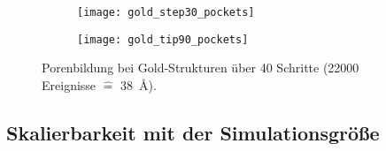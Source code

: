 \begin{figure}
  \captionsetup[subfigure]{singlelinecheck=false}
  \def\subfigwidth{0.49\textwidth}

  \begin{subfigure}[t]{\subfigwidth}
    \texttt{[image: gold\_step30\_pockets]}
    \label{fig:goldpockets-a}
  \end{subfigure}
  \hfill
  \begin{subfigure}[t]{\subfigwidth}
    \texttt{[image: gold\_tip90\_pockets]}
    \label{fig:goldpockets-b}
  \end{subfigure}

  \caption[Porenbildung bei Gold-Strukturen]{Porenbildung bei Gold-Strukturen über \num{40} Schritte (\num{22000} Ereignisse $\hat{=}$ \SI{38}{\angstrom}).
  }
  \label{fig:goldpockets}
\end{figure}

\subsection{Skalierbarkeit mit der Simulationsgröße}
\label{goldscalability}

